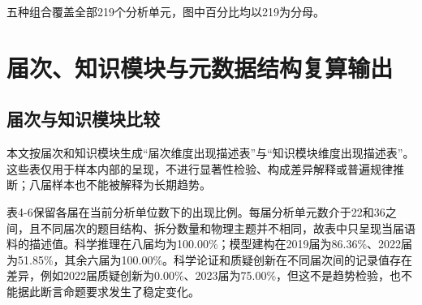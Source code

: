 \documentclass[
  12pt,
  a4paper]{ctexbook}
\begin{document}
五种组合覆盖全部219个分析单元，图中百分比均以219为分母。

\section{届次、知识模块与元数据结构复算输出}\label{ux5c4aux6b21ux77e5ux8bc6ux6a21ux5757ux4e0eux5143ux6570ux636eux7ed3ux6784ux590dux7b97ux8f93ux51fa}

\subsection{届次与知识模块比较}\label{ux5c4aux6b21ux4e0eux77e5ux8bc6ux6a21ux5757ux6bd4ux8f83}

本文按届次和知识模块生成``届次维度出现描述表''与``知识模块维度出现描述表''。这些表仅用于样本内部的呈现，不进行显著性检验、构成差异解释或普遍规律推断；八届样本也不能被解释为长期趋势。

表4-6保留各届在当前分析单位数下的出现比例。每届分析单元数介于22和36之间，且不同届次的题目结构、拆分数量和物理主题并不相同，故表中只呈现当届语料的描述值。科学推理在八届均为100.00\%；模型建构在2019届为86.36\%、2022届为51.85\%，其余六届为100.00\%。科学论证和质疑创新在不同届次间的记录值存在差异，例如2022届质疑创新为0.00\%、2023届为75.00\%，但这不是趋势检验，也不能据此断言命题要求发生了稳定变化。
\end{document}
